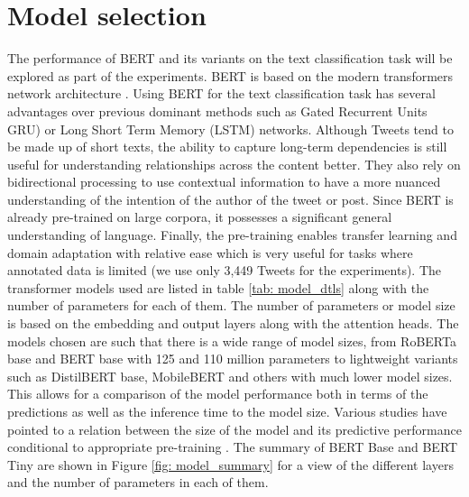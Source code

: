 \section{Model selection}
The performance of BERT and its variants on the text classification task will be explored as part of the experiments. BERT \cite{devlinBERTPretrainingDeep2018} is based on the modern transformers network architecture \cite{vaswaniAttentionAllYou2023a}. Using BERT for the text classification task has several advantages over previous dominant methods such as Gated Recurrent Units GRU) \cite{chungEmpiricalEvaluationGated2014} or Long Short Term Memory (LSTM) \cite{hochreiterLongShortTermMemory1997} networks. Although Tweets tend to be made up of short texts, the ability to capture long-term dependencies is still useful for understanding relationships across the content better. They also rely on bidirectional processing to use contextual information to have a more nuanced understanding of the intention of the author of the tweet or post. Since BERT is already pre-trained on large corpora, it possesses a significant general understanding of language. Finally, the pre-training enables transfer learning and domain adaptation with relative ease which is very useful for tasks where annotated data is limited (we use only 3,449 Tweets for the experiments).
\newline\newline
The transformer models used are listed in table \ref{tab: model_dtls} along with the number of parameters for each of them. The number of parameters or model size is based on the embedding and output layers along with the attention heads. The models chosen are such that there is a wide range of model sizes, from RoBERTa base and BERT base with 125 and 110 million parameters to lightweight variants such as DistilBERT base, MobileBERT and others with much lower model sizes. This allows for a comparison of the model performance both in terms of the predictions as well as the inference time to the model size. Various studies have pointed to a relation between the size of the model and its predictive performance conditional to appropriate pre-training \cite{vaswaniAttentionAllYou2023a,liuRoBERTaRobustlyOptimized2019}. The summary of BERT Base and BERT Tiny are shown in Figure \ref{fig: model_summary} for a view of the different layers and the number of parameters in each of them.

